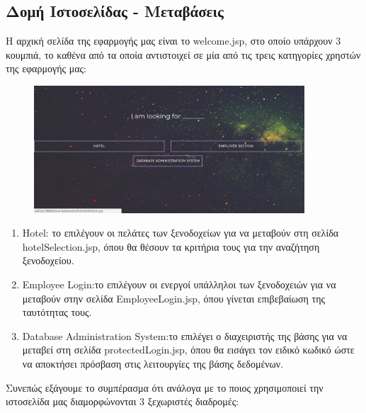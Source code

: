 \documentclass[a4paper,oneside, 11pt]{article}
\begin{document}
\subsection{Δομή Ιστοσελίδας - Μεταβάσεις}
H αρχική σελίδα της εφαρμογής μας είναι το welcome.jsp, στο οποίο υπάρχουν 3 κουμπιά, το καθένα από τα οποία αντιστοιχεί σε μία από τις τρεις κατηγορίες χρηστών της εφαρμογής μας:
\begin{figure}[h]
\center
\includegraphics[width=0.9\textwidth]{welcome.jpg}
\end{figure}

\begin{enumerate}
\item Hotel: το επιλέγουν οι πελάτες των ξενοδοχείων για να μεταβούν στη σελίδα hotelSelection.jsp, όπου θα θέσουν τα κριτήρια τους για την αναζήτηση ξενοδοχείου.
\item Employee Login:το επιλέγουν οι ενεργοί υπάλληλοι των ξενοδοχειών για να μεταβούν στην σελίδα EmployeeLogin.jsp, όπου γίνεται επιβεβαίωση της ταυτότητας τους.
\item Database Administration System:το επιλέγει ο διαχειριστής της βάσης για να μεταβεί στη σελίδα protectedLogin.jsp, όπου θα εισάγει τον ειδικό κωδικό ώστε να αποκτήσει πρόσβαση στις λειτουργίες της βάσης δεδομένων.
\end{enumerate}

Συνεπώς εξάγουμε το συμπέρασμα ότι ανάλογα με το ποιος χρησιμοποιεί την ιστοσελίδα μας διαμορφώνονται 3 ξεχωριστές διαδρομές:
\end{document}
